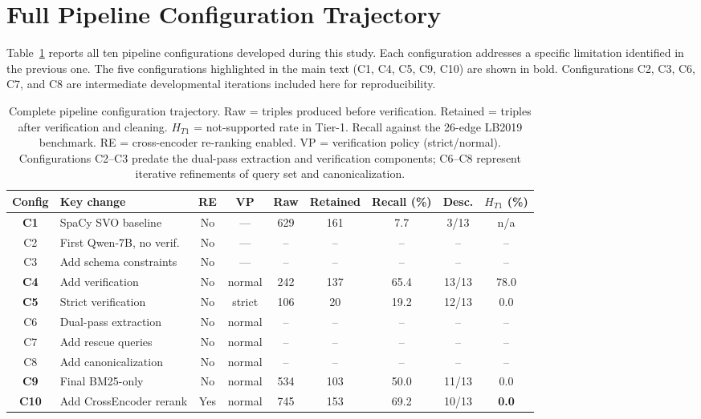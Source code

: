 \documentclass[10pt]{article}
\begin{document}
\section{Full Pipeline Configuration Trajectory}
\label{app:full-trajectory}

Table~\ref{tab:full-trajectory} reports all ten
pipeline configurations developed during this study.
Each configuration addresses a specific limitation
identified in the previous one.
The five configurations highlighted in the main text
(C1, C4, C5, C9, C10) are shown in bold.
Configurations C2, C3, C6, C7, and C8 are
intermediate developmental iterations included here
for reproducibility.

\begin{table}[htb]
\centering
\caption{Complete pipeline configuration trajectory.
  Raw = triples produced before verification.
  Retained = triples after verification and cleaning.
  $H_{T1}$ = not-supported rate in Tier-1.
  Recall against the 26-edge LB2019 benchmark.
  RE = cross-encoder re-ranking enabled.
  VP = verification policy (strict/normal).
  Configurations C2--C3 predate the dual-pass
  extraction and verification components;
  C6--C8 represent iterative refinements of
  query set and canonicalization.}
\label{tab:full-trajectory}
\small
\setlength{\tabcolsep}{4pt}
\begin{tabular}{clccccccc}
\toprule
\textbf{Config} &
\textbf{Key change} &
\textbf{RE} &
\textbf{VP} &
\textbf{Raw} &
\textbf{Retained} &
\textbf{Recall (\%)} &
\textbf{Desc.} &
$H_{T1}$ (\%) \\
\midrule
\textbf{C1}
  & SpaCy SVO baseline
  & No & --- & 629 & 161 & 7.7 & 3/13 & n/a \\
C2
  & First Qwen-7B, no verif.
  & No & --- & -- & -- & -- & -- & -- \\
C3
  & Add schema constraints
  & No & --- & -- & -- & -- & -- & -- \\
\textbf{C4}
  & Add verification
  & No & normal & 242 & 137 & 65.4 & 13/13 & 78.0 \\
\textbf{C5}
  & Strict verification
  & No & strict & 106 & 20 & 19.2 & 12/13 & 0.0 \\
C6
  & Dual-pass extraction
  & No & normal & -- & -- & -- & -- & -- \\
C7
  & Add rescue queries
  & No & normal & -- & -- & -- & -- & -- \\
C8
  & Add canonicalization
  & No & normal & -- & -- & -- & -- & -- \\
\textbf{C9}
  & Final BM25-only
  & No & normal & 534 & 103 & 50.0 & 11/13 & 0.0 \\
\textbf{C10}
  & Add CrossEncoder rerank
  & Yes & normal & 745 & 153 & 69.2 & 10/13 & \textbf{0.0} \\
\bottomrule
\end{tabular}
\end{table}
\end{document}
